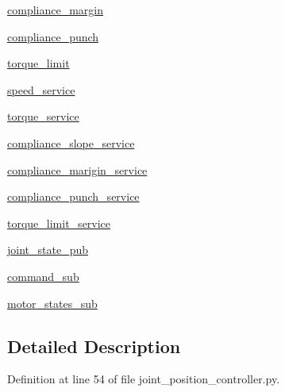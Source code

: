 \begin{DoxyCompactItemize}
\hyperlink{classdynamixel__controllers_1_1joint__controller_1_1_joint_controller_a27ef273b035027725534aa6ef45b6462}{compliance\+\_\+margin}
\item 
\hyperlink{classdynamixel__controllers_1_1joint__controller_1_1_joint_controller_a4e3ce35a23d0b5b961a43c0e1d9d14a6}{compliance\+\_\+punch}
\item 
\hyperlink{classdynamixel__controllers_1_1joint__controller_1_1_joint_controller_a5d555adb1d0f05be5b43d1fd54e6652a}{torque\+\_\+limit}
\item 
\hyperlink{classdynamixel__controllers_1_1joint__controller_1_1_joint_controller_ad08c30ce31dec43a50d834d45c1d669e}{speed\+\_\+service}
\item 
\hyperlink{classdynamixel__controllers_1_1joint__controller_1_1_joint_controller_ac033f7205e272cceafd190ad66dbd71e}{torque\+\_\+service}
\item 
\hyperlink{classdynamixel__controllers_1_1joint__controller_1_1_joint_controller_aff0ed417286fdd03e03ac8e3a446a45b}{compliance\+\_\+slope\+\_\+service}
\item 
\hyperlink{classdynamixel__controllers_1_1joint__controller_1_1_joint_controller_a91f03c9ccdece33a94f0bcb72c5bc582}{compliance\+\_\+marigin\+\_\+service}
\item 
\hyperlink{classdynamixel__controllers_1_1joint__controller_1_1_joint_controller_a65dbf0b3b19b26c009579e8853262276}{compliance\+\_\+punch\+\_\+service}
\item 
\hyperlink{classdynamixel__controllers_1_1joint__controller_1_1_joint_controller_a1555dcae38a12011ee6d11140bf6d6d7}{torque\+\_\+limit\+\_\+service}
\item 
\hyperlink{classdynamixel__controllers_1_1joint__controller_1_1_joint_controller_a05aab8618e98e299d5aaf86bd301229d}{joint\+\_\+state\+\_\+pub}
\item 
\hyperlink{classdynamixel__controllers_1_1joint__controller_1_1_joint_controller_a867bb1c6fc7084a725ff37a2c118d60d}{command\+\_\+sub}
\item 
\hyperlink{classdynamixel__controllers_1_1joint__controller_1_1_joint_controller_affc8be5e697a2ae71d284d8e0e59a4bd}{motor\+\_\+states\+\_\+sub}
\end{DoxyCompactItemize}


\subsection{Detailed Description}


Definition at line 54 of file joint\+\_\+position\+\_\+controller.\+py.



